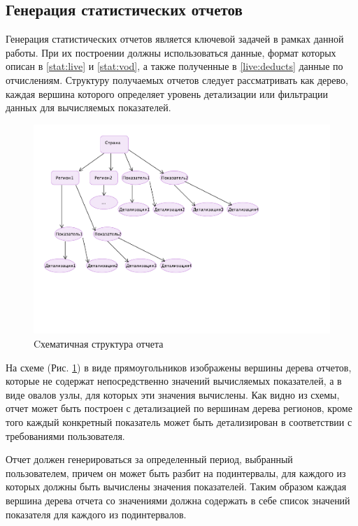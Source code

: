 \subsection{Генерация статистических отчетов}
\label{section:stat_reports_task}
Генерация статистических отчетов является ключевой задачей в рамках данной работы. При их построении должны использоваться
данные, формат которых описан в \ref{stat:live} и \ref{stat:vod}, а также полученные в \ref{live:deducts}
данные по отчислениям. 
Структуру получаемых отчетов следует рассматривать как дерево, каждая вершина которого определяет уровень детализации
или фильтрации данных для вычисляемых показателей.

\begin{figure}[!ht]
\begin{center}
\hspace*{-1cm} \includegraphics[scale=0.6, trim=0mm 50mm 70mm 0mm, clip]{../resources/uml/ReportScheme.pdf}
\caption{Cхематичная структура отчета}
\label{gr:report:scheme}
\end{center}
\end{figure} 

На схеме (Рис. \ref{gr:report:scheme}) в виде прямоугольников изображены вершины дерева отчетов,
которые не содержат непосредственно значений вычисляемых показателей, а в виде овалов узлы,
для которых эти значения вычислены. Как видно из схемы, отчет может быть построен с детализацией 
по вершинам дерева регионов, кроме того каждый конкретный показатель может быть детализирован
в соответствии с требованиями пользователя.

Отчет должен генерироваться за определенный период, выбранный пользователем, причем он может быть 
разбит на подинтервалы, для каждого из которых должны быть вычислены значения показателей.
Таким образом каждая вершина дерева отчета со значениями должна содержать в себе список 
значений показателя для каждого из подинтервалов.

